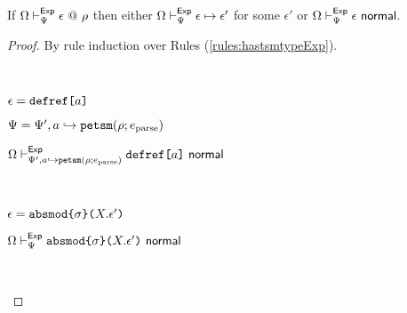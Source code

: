 \begin{theorem}
\label{thm:peTSM-progress}
If $\Omega \vdash_{\Psi}^{\mathsf{Exp}} \epsilon ~@~ \rho$ then either $\Omega \vdash_{\Psi}^\mathsf{Exp} \epsilon \mapsto \epsilon'$ for some $\epsilon'$ or $\Omega \vdash_{\Psi}^\mathsf{Exp} \epsilon~\mathsf{normal}$.
\end{theorem}
\begin{proof}
By rule induction over Rules (\ref{rules:hastsmtypeExp}).
\begin{byCases}
  \item[\text{(\ref{rule:hastsmtypeExp-defref})}] ~
    \begin{pfsteps*}
      \item $\epsilon=\texttt{defref}\texttt{[}a\texttt{]}$ 
      \item $\Psi=\Psi', a \hookrightarrow \texttt{petsm}(\rho; e_\text{parse})$ 
      \item $\Omega \vdash_{\Psi', a \hookrightarrow \texttt{petsm}(\rho; e_\text{parse})}^\mathsf{Exp} \texttt{defref}\texttt{[}a\texttt{]}~\mathsf{normal}$ 
    \end{pfsteps*}
    \resetpfcounter
  \item[\text{(\ref{rule:hastsmtypeExp-absmod})}] ~
    \begin{pfsteps*}
      \item $\epsilon=\texttt{absmod}\texttt{\{}\sigma\texttt{\}(}X.\epsilon'\texttt{)}$ 
      \item $\Omega \vdash_{\Psi}^\mathsf{Exp} \texttt{absmod}\texttt{\{}\sigma\texttt{\}(}X.\epsilon'\texttt{)}~\mathsf{normal}$ 
    \end{pfsteps*}
    \resetpfcounter
  \item[\text{(\ref{rule:hastsmtypeExp-apmod})}] ~
    \begin{pfsteps*}

\end{pfsteps*}
\end{byCases}
\end{proof}
